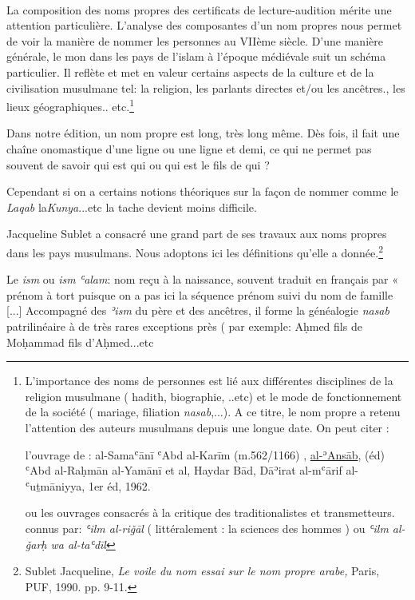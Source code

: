\documentclass[a4paper,12pt]{report}
\begin{document}
\begin{itemize}
\begin{enumerate}
\paragraph{}
La composition des noms propres des certificats de lecture-audition mérite une attention particulière. L'analyse des composantes d'un nom propres nous permet de voir la manière de nommer les personnes au VIIème siècle. D'une manière générale, le mon dans les pays de l'islam à l'époque médiévale   suit un schéma particulier.  Il reflète et met en valeur certains aspects de la culture et de la civilisation musulmane tel: la religion,  les parlants directes  et/ou les ancêtres., les lieux géographiques.. etc.\footnote{ L'importance des noms de personnes est lié aux différentes disciplines de la religion musulmane ( hadith, biographie, ..etc) et le mode de fonctionnement de la société  ( mariage, filiation \textit{nasab},...). A ce titre,  le nom propre a retenu l'attention des auteurs musulmans depuis une longue date. On peut citer :

 l'ouvrage   de  : al-Samaʿānī ʿAbd al-Karīm  (m.562/1166) , \underline {al-ʾAnsāb}, (éd) ʿAbd al-Raḥmān al-Yamānī et al, Haydar Bād, Dāʾirat al-mʿārif al-ʿuṯmāniyya, 1er éd, 1962.    

ou les ouvrages consacrés à la critique des traditionalistes et transmetteurs. connus par: 
\textit{ʿilm al-riǧāl} ( littéralement :  la sciences des hommes )   ou  \textit{ʿilm al-ǧarḥ wa al-taʿdīl }} 


Dans notre  édition, un nom propre est long,  très long même. Dès fois, il fait une  chaîne onomastique  d'une ligne ou  une ligne et demi, ce qui ne permet pas souvent de savoir qui est qui ou qui est le fils de qui ? 

Cependant si on a certains notions théoriques sur la façon de nommer comme le   \textit{Laqab}  la\textit{Kunya}...etc la tache devient moins difficile. 

 Jacqueline Sublet a consacré une grand part de ses travaux aux noms propres dans les pays musulmans. Nous adoptons  ici les définitions qu'elle a donnée.\footnote{Sublet Jacqueline, \textit{Le voile du nom essai sur le nom propre arabe,} Paris, PUF, 1990. pp. 9-11.}  

  Le \textit{ism} ou \textit{ism ʿalam}: nom reçu à la naissance, souvent traduit en français   par « prénom  à tort puisque on a pas ici la séquence prénom suivi du nom de famille [...] Accompagné des \textit{ʾism} du père et des ancêtres, il forme la généalogie \textit{nasab} patrilinéaire à de très rares exceptions près ( par exemple: 	Aḥmed fils de Moḥammad  fils d’Aḥmed...etc


\end{enumerate}
\end{itemize}
\end{document}
